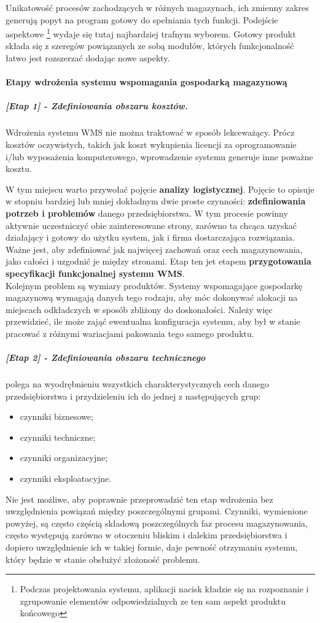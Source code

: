 	Unikatowość procesów zachodzących w różnych magazynach, ich zmienny zakres generują popyt
	na program gotowy do spełniania tych funkcji. Podejście aspektowe \footnote{
		Podczas projektowania systemu, aplikacji nacisk kładzie się na rozpoznanie i
		zgrupowanie elementów odpowiedzialnych ze ten sam aspekt produktu końcowego	
	} wydaje się tutaj najbardziej trafnym wyborem. Gotowy produkt składa się z szeregów
	powiązanych ze sobą modułów, których funkcjonalność łatwo jest rozszerzać dodając nowe
	aspekty.
	
	\paragraph{Etapy wdrożenia systemu wspomagania gospodarką magazynową}
		\subparagraph{[Etap 1] - \textbf{Zdefiniowania obszaru kosztów.}} 			
		\label{c5:introducing_wms_stage_1}
			Wdrożenia systemu WMS nie można traktować w sposób lekceważący. Prócz kosztów oczywistych,
			takich jak koszt wykupienia licencji za oprogramowanie i/lub wyposażenia komputerowego,
			wprowadzenie systemu generuje inne poważne kosztu. 
			
			W tym miejscu warto przywołać pojęcie \textbf{analizy logistycznej}. Pojęcie to opisuje w stopniu
			bardziej lub mniej dokładnym dwie proste czynności: \textbf{zdefiniowania potrzeb i problemów} 
			danego przedsiębiorstwa. W tym procesie powinny aktywnie uczestniczyć obie zainteresowane strony, 
			zarówno ta chcąca uzyskać działający i gotowy do użytku system, jak i firma dostarczająca
			rozwiązania. Ważne jest, aby zdefiniować jak najwięcej zachowań oraz cech magazynowania, jako całości
			i uzgodnić je między stronami. Etap ten jet etapem \textbf{przygotowania specyfikacji 
			funkcjonalnej systemu WMS}. \\
			
			Kolejnym problem są wymiary produktów. Systemy wspomagające gospodarkę magazynową wymagają danych
			tego rodzaju, aby móc dokonywać alokacji na miejscach odkładczych w sposób zbliżony do doskonałości.
			Należy więc przewidzieć, ile może zająć ewentualna konfiguracja systemu, aby był w stanie pracować
			z różnymi wariacjami pakowania tego samego produktu.
		\subparagraph{[Etap 2] - \textbf{Zdefiniowania obszaru technicznego}} 	
		\label{c5:introducing_wms_stage_2}
			polega na wyodrębnieniu
			wszystkich charakterystycznych cech danego przedsiębiorstwa i
			przydzieleniu ich do jednej z następujących grup:
			\begin{itemize}
				\item czynniki biznesowe;
				\item czynniki techniczne;
				\item czynniki organizacyjne;
				\item czynniki eksploatacyjne.
			\end{itemize}
			Nie jest możliwe, aby poprawnie przeprowadzić ten etap wdrożenia bez uwzględnienia
			powiązań między poszczególnymi grupami. Czynniki, wymienione powyżej, są często
			częścią składową poszczególnych faz procesu magazynowania, często występują zarówno
			w otoczeniu bliskim i dalekim przedsiębiorstwa i dopiero uwzględnienie ich w takiej
			formie, daje pewność otrzymaniu systemu, który będzie w stanie obsłużyć 
			złożoność problemu.

